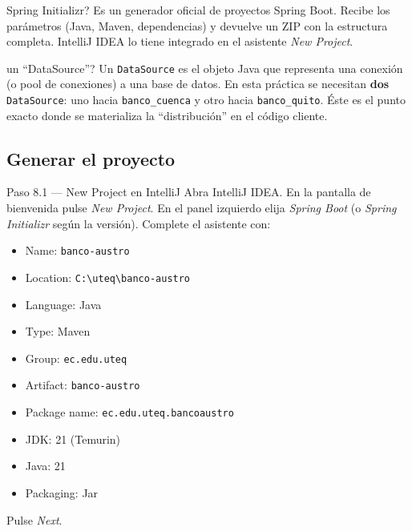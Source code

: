 \documentclass[11pt,a4paper]{article}
\begin{document}
\begin{conceptobox}{Spring Initializr?}
Es un generador oficial de proyectos Spring Boot. Recibe los par\'ametros (Java, Maven, dependencias) y devuelve un ZIP con la estructura completa. IntelliJ IDEA lo tiene integrado en el asistente \emph{New Project}.
\end{conceptobox}

\begin{conceptobox}{un ``DataSource''?}
Un \texttt{DataSource} es el objeto Java que representa una conexi\'on (o pool de conexiones) a una base de datos. En esta pr\'actica se necesitan \textbf{dos} \texttt{DataSource}: uno hacia \texttt{banco\_cuenca} y otro hacia \texttt{banco\_quito}. \'Este es el punto exacto donde se materializa la ``distribuci\'on'' en el c\'odigo cliente.
\end{conceptobox}

\subsection{Generar el proyecto}

\begin{pasobox}{Paso 8.1 --- New Project en IntelliJ}
Abra IntelliJ IDEA. En la pantalla de bienvenida pulse \emph{New Project}. En el panel izquierdo elija \emph{Spring Boot} (o \emph{Spring Initializr} seg\'un la versi\'on). Complete el asistente con:

\begin{itemize}[leftmargin=1.2em]
    \item Name: \texttt{banco-austro}
    \item Location: \texttt{C:\textbackslash uteq\textbackslash banco-austro}
    \item Language: Java
    \item Type: Maven
    \item Group: \texttt{ec.edu.uteq}
    \item Artifact: \texttt{banco-austro}
    \item Package name: \texttt{ec.edu.uteq.bancoaustro}
    \item JDK: 21 (Temurin)
    \item Java: 21
    \item Packaging: Jar
\end{itemize}

Pulse \emph{Next}.
\end{pasobox}
\end{document}

